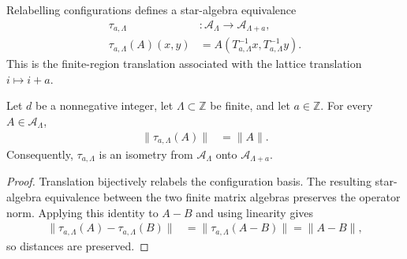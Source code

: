 \begin{definition}
    \label{def:qca_finite_local_translation}
    \leanok
    Relabelling configurations defines a star-algebra equivalence
    \begin{align}
        \tau_{a,\Lambda} & \colon\mathcal A_\Lambda
        \longrightarrow\mathcal A_{\Lambda+a},                          \\
        \tau_{a,\Lambda}(A)(x,y)
                         & =A(T_{a,\Lambda}^{-1}x,T_{a,\Lambda}^{-1}y).
    \end{align}
    This is the finite-region translation associated with the lattice
    translation $i\mapsto i+a$.
\end{definition}

\begin{lemma}
    \label{lem:qca_finite_local_translation_norm}
    \leanok
    Let $d$ be a nonnegative integer, let $\Lambda\subset\mathbb Z$ be finite,
    and let $a\in\mathbb Z$. For every $A\in\mathcal A_\Lambda$,
    \begin{align}
        \lVert\tau_{a,\Lambda}(A)\rVert & =\lVert A\rVert.
    \end{align}
    Consequently, $\tau_{a,\Lambda}$ is an isometry from
    $\mathcal A_\Lambda$ onto $\mathcal A_{\Lambda+a}$.
\end{lemma}

\begin{proof}\leanok
    Translation bijectively relabels the configuration basis. The resulting
    star-algebra equivalence between the two finite matrix algebras preserves
    the operator norm. Applying this identity to $A-B$ and using linearity gives
    \begin{align}
        \lVert\tau_{a,\Lambda}(A)-\tau_{a,\Lambda}(B)\rVert
         & =\lVert\tau_{a,\Lambda}(A-B)\rVert
        =\lVert A-B\rVert,
    \end{align}
    so distances are preserved.
\end{proof}

